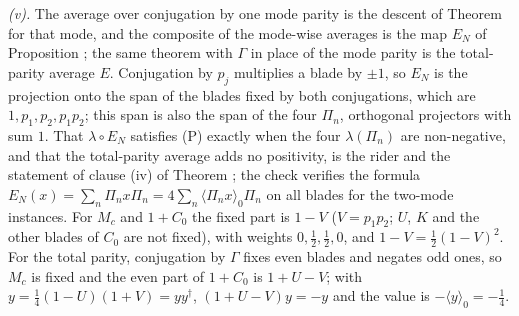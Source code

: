 \emph{(v).} The average over conjugation by one mode parity is the descent of Theorem  for that mode, and the composite of the mode-wise averages is the map $E_{N}$ of Proposition ; the same theorem with $\Gamma$ in place of the mode parity is the total-parity average $E$. Conjugation by $p_{j}$ multiplies a blade by $\pm 1$, so $E_{N}$ is the projection onto the span of the blades fixed by both conjugations, which are $1, p_{1}, p_{2}, p_{1}p_{2}$; this span is also the span of the four $\Pi_{n}$, orthogonal projectors with sum $1$. That $\lambda \circ E_{N}$ satisfies (P) exactly when the four $\lambda(\Pi_{n})$ are non-negative, and that the total-parity average adds no positivity, is the rider and the statement of clause (iv) of Theorem ; the check verifies the formula $E_{N}(x) = \sum_{n}\Pi_{n}x\Pi_{n} = 4\sum_{n}\langle\Pi_{n}x\rangle_{0}\Pi_{n}$ on all blades for the two-mode instances. For $M_{c}$ and $1 + C_{0}$ the fixed part is $1 - V$ ($V = p_{1}p_{2}$; $U$, $K$ and the other blades of $C_{0}$ are not fixed), with weights $0, \tfrac12, \tfrac12, 0$, and $1 - V = \tfrac12(1 - V)^{2}$. For the total parity, conjugation by $\Gamma$ fixes even blades and negates odd ones, so $M_{c}$ is fixed and the even part of $1 + C_{0}$ is $1 + U - V$; with $y = \tfrac14(1 - U)(1 + V) = yy^{\dagger}$, $(1 + U - V)y = -y$ and the value is $-\langle y\rangle_{0} = -\tfrac14$.

